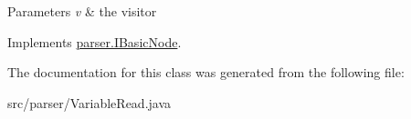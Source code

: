 \begin{DoxyParams}{Parameters}
{\em v} & the visitor \\
\hline
\end{DoxyParams}


Implements \hyperlink{interfaceparser_1_1_i_basic_node_af8790b7076c59e00781ba3d4118757cd}{parser.\+I\+Basic\+Node}.



The documentation for this class was generated from the following file\+:\begin{DoxyCompactItemize}
\item 
src/parser/Variable\+Read.\+java\end{DoxyCompactItemize}
